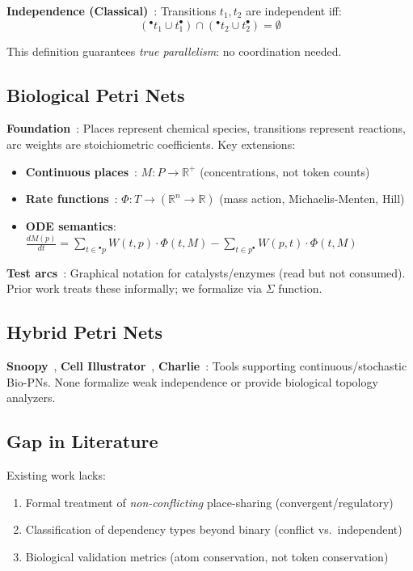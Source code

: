 \documentclass{article}
\newcommand{\preset}[1]{\ensuremath{{}^{\bullet}#1}}
\newcommand{\postset}[1]{\ensuremath{#1^{\bullet}}}
\begin{document}
\textbf{Independence (Classical)}~\cite{Reisig2013}: Transitions $t_1, t_2$ are independent iff:
\begin{equation}
(\preset{t_1} \cup \postset{t_1}) \cap (\preset{t_2} \cup \postset{t_2}) = \emptyset
\label{eq:classical_independence}
\end{equation}

This definition guarantees \emph{true parallelism}: no coordination needed.

\subsection{Biological Petri Nets}

\textbf{Foundation}~\cite{Reddy1993}: Places represent chemical species, transitions represent reactions, arc weights are stoichiometric coefficients. Key extensions:
\begin{itemize}
    \item \textbf{Continuous places}~\cite{Heiner2008}: $M: P \to \mathbb{R}^+$ (concentrations, not token counts)
    \item \textbf{Rate functions}~\cite{Gilbert2006}: $\Phi: T \to (\mathbb{R}^n \to \mathbb{R})$ (mass action, Michaelis-Menten, Hill)
    \item \textbf{ODE semantics}: $\frac{dM(p)}{dt} = \sum_{t \in \preset{p}} W(t,p) \cdot \Phi(t, M) - \sum_{t \in \postset{p}} W(p,t) \cdot \Phi(t, M)$
\end{itemize}

\textbf{Test arcs}~\cite{Koch2011}: Graphical notation for catalysts/enzymes (read but not consumed). Prior work treats these informally; we formalize via $\Sigma$ function.

\subsection{Hybrid Petri Nets}

\textbf{Snoopy}~\cite{Heiner2015}, \textbf{Cell Illustrator}~\cite{Nagasaki2011}, \textbf{Charlie}~\cite{Heiner2009}: Tools supporting continuous/stochastic Bio-PNs. None formalize weak independence or provide biological topology analyzers.

\subsection{Gap in Literature}

Existing work lacks:
\begin{enumerate}
    \item Formal treatment of \emph{non-conflicting} place-sharing (convergent/regulatory)
    \item Classification of dependency types beyond binary (conflict vs.\ independent)
    \item Biological validation metrics (atom conservation, not token conservation)
\end{enumerate}
\end{document}
